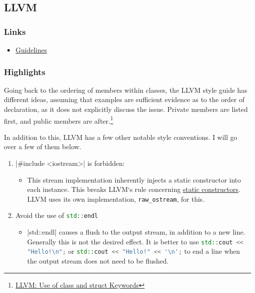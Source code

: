 \documentclass[12pt]{report}
\theoremstyle{definition}
\theoremstyle{plain}
\theoremstyle{plain}
\begin{document}
 
        \subsection{LLVM}
          \subsubsection{Links}
            \begin{itemize}
                \item \href{https://llvm.org/docs/CodingStandards.html}{Guidelines}
            \end{itemize}
          \subsubsection{Highlights}
            Going back to the ordering of members within classes, the LLVM style guide has
              different ideas, assuming that examples are sufficient evidence as to the order of declaration,
              as it does not explicitly discuss the issue. Private members are listed first, and public
              members are after.\footnote{\href{https://llvm.org/docs/CodingStandards.html\#use-of-class-and-struct-keywords}{LLVM: Use of class and struct Keywords}}
              
            In addition to this, LLVM has a few other notable style conventions. I will go over a few of them below.
              \begin{enumerate}
                  \item |#include <iostream>| is forbidden:
                  \begin{itemize}
                      \item This stream implementation inherently injects a static constructor into each
                        instance. This breaks LLVM`s rule concerning \href{https://llvm.org/docs/CodingStandards.html#static-constructor}{static constructors}.
                        LLVM uses its own implementation, \texttt{raw\_ostream}, for this. 
                  \end{itemize}
                  \item Avoid the use of \lstinline[language=c++,columns=fixed]{std::endl}
                    \begin{itemize}
                        \item |std::endl| causes a flush to the output
                          stream, in addition to a new line. Generally this is not the desired effect. It is
                          better to use \lstinline[language=c++,columns=fixed]{std::cout << "Hello!\n";} or
                          \lstinline[language=c++,columns=fixed]{std::cout << "Hello!" << '\n';} to end a line
                          when the output stream does not need to be flushed.
                    \end{itemize}
              \end{enumerate}
              
\end{document}
